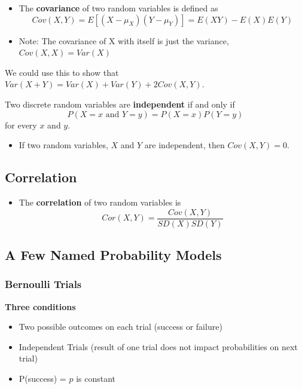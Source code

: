 \documentclass[
]{book}
\providecommand{\tightlist}{%
  \setlength{\itemsep}{0pt}\setlength{\parskip}{0pt}}
\begin{document}
\begin{itemize}
\item
  The \textbf{covariance} of two random variables is defined as
  \[Cov(X,Y) = E[(X - \mu_X)(Y - \mu_Y)] = E(XY) - E(X)E(Y)\]
\item
  Note: The covariance of X with itself is just the variance, \(Cov(X,X) = Var(X)\)
\end{itemize}

We could use this to show that \(Var(X+Y) = Var(X)+ Var(Y) + 2Cov(X,Y)\).

Two discrete random variables are \textbf{independent} if and only if
\[P(X = x\text{ and } Y = y)  = P(X=x)P(Y=y)\]
for every \(x\) and \(y\).

\begin{itemize}
\tightlist
\item
  If two random variables, \(X\) and \(Y\) are independent, then \(Cov(X,Y)= 0\).
\end{itemize}

\hypertarget{correlation}{%
\subsection{Correlation}\label{correlation}}

\begin{itemize}
\tightlist
\item
  The \textbf{correlation} of two random variables is
  \[Cor(X,Y) =\frac{Cov(X,Y)}{SD(X)SD(Y)}\]
\end{itemize}

\hypertarget{a-few-named-probability-models}{%
\subsection{A Few Named Probability Models}\label{a-few-named-probability-models}}

\hypertarget{bernoulli-trials}{%
\subsubsection{Bernoulli Trials}\label{bernoulli-trials}}

\textbf{Three conditions}

\begin{itemize}
\tightlist
\item
  Two possible outcomes on each trial (success or failure)
\item
  Independent Trials (result of one trial does not impact probabilities on next trial)
\item
  P(success) = \(p\) is constant
\end{itemize}
\end{document}
